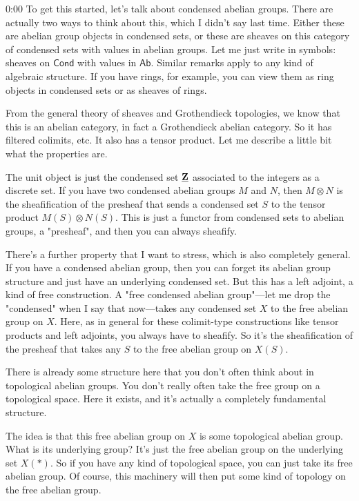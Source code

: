 \begin{unfinished}{0:00}
To get this started, let's talk about condensed abelian groups. There are actually two ways to think about this, which I didn't say last time. Either these are abelian group objects in condensed sets, or these are sheaves on this category of condensed sets with values in abelian groups. Let me just write in symbols: sheaves on $\mathsf{Cond}$ with values in $\mathsf{Ab}$. Similar remarks apply to any kind of algebraic structure. If you have rings, for example, you can view them as ring objects in condensed sets or as sheaves of rings.

From the general theory of sheaves and Grothendieck topologies, we know that this is an abelian category, in fact a Grothendieck abelian category. So it has filtered colimits, etc. It also has a tensor product. Let me describe a little bit what the properties are.

The unit object is just the condensed set $\underline{\mathbf Z}$ associated to the integers as a discrete set. If you have two condensed abelian groups $M$ and $N$, then $M\otimes N$ is the sheafification of the presheaf that sends a condensed set $S$ to the tensor product $M(S)\otimes N(S)$. This is just a functor from condensed sets to abelian groups, a "presheaf", and then you can always sheafify.

There's a further property that I want to stress, which is also completely general. If you have a condensed abelian group, then you can forget its abelian group structure and just have an underlying condensed set. But this has a left adjoint, a kind of free construction. A "free condensed abelian group"---let me drop the "condensed" when I say that now---takes any condensed set $X$ to the free abelian group on $X$. Here, as in general for these colimit-type constructions like tensor products and left adjoints, you always have to sheafify. So it's the sheafification of the presheaf that takes any $S$ to the free abelian group on $X(S)$.

There is already some structure here that you don't often think about in topological abelian groups. You don't really often take the free group on a topological space. Here it exists, and it's actually a completely fundamental structure.

The idea is that this free abelian group on $X$ is some topological abelian group. What is its underlying group? It's just the free abelian group on the underlying set $X(\ast)$. So if you have any kind of topological space, you can just take its free abelian group. Of course, this machinery will then put some kind of topology on the free abelian group.


\end{unfinished}
